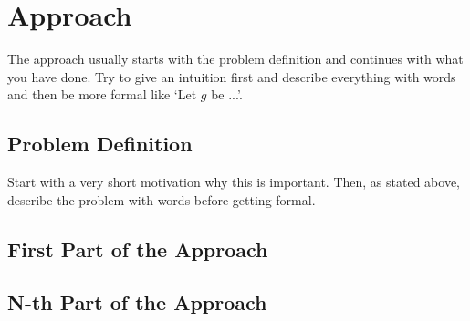 \chapter{Approach}\label{chap:approach}
The approach usually starts with the problem definition and continues with what you have done. Try to give an intuition first and describe everything with words and then be more formal like `Let $g$ be ...'.

\section{Problem Definition}
Start with a very short motivation why this is important. Then, as stated above, describe the problem with words before getting formal.

\section{First Part of the Approach}

\section{N-th Part of the Approach}